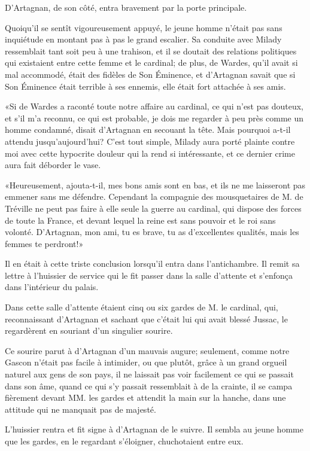 D'Artagnan, de son côté, entra bravement par la porte principale. 

Quoiqu'il se sentît vigoureusement appuyé, le jeune homme n'était pas sans inquiétude en montant pas à pas le grand escalier. Sa conduite avec Milady ressemblait tant soit peu à une trahison, et il se doutait des relations politiques qui existaient entre cette femme et le cardinal; de plus, de Wardes, qu'il avait si mal accommodé, était des fidèles de Son Éminence, et d'Artagnan savait que si Son Éminence était terrible à ses ennemis, elle était fort attachée à ses amis. 

«Si de Wardes a raconté toute notre affaire au cardinal, ce qui n'est pas douteux, et s'il m'a reconnu, ce qui est probable, je dois me regarder à peu près comme un homme condamné, disait d'Artagnan en secouant la tête. Mais pourquoi a-t-il attendu jusqu'aujourd'hui? C'est tout simple, Milady aura porté plainte contre moi avec cette hypocrite douleur qui la rend si intéressante, et ce dernier crime aura fait déborder le vase. 

«Heureusement, ajouta-t-il, mes bons amis sont en bas, et ils ne me laisseront pas emmener sans me défendre. Cependant la compagnie des mousquetaires de M. de Tréville ne peut pas faire à elle seule la guerre au cardinal, qui dispose des forces de toute la France, et devant lequel la reine est sans pouvoir et le roi sans volonté. D'Artagnan, mon ami, tu es brave, tu as d'excellentes qualités, mais les femmes te perdront!» 

Il en était à cette triste conclusion lorsqu'il entra dans l'antichambre. Il remit sa lettre à l'huissier de service qui le fit passer dans la salle d'attente et s'enfonça dans l'intérieur du palais. 

Dans cette salle d'attente étaient cinq ou six gardes de M. le cardinal, qui, reconnaissant d'Artagnan et sachant que c'était lui qui avait blessé Jussac, le regardèrent en souriant d'un singulier sourire. 

Ce sourire parut à d'Artagnan d'un mauvais augure; seulement, comme notre Gascon n'était pas facile à intimider, ou que plutôt, grâce à un grand orgueil naturel aux gens de son pays, il ne laissait pas voir facilement ce qui se passait dans son âme, quand ce qui s'y passait ressemblait à de la crainte, il se campa fièrement devant MM. les gardes et attendit la main sur la hanche, dans une attitude qui ne manquait pas de majesté. 

L'huissier rentra et fit signe à d'Artagnan de le suivre. Il sembla au jeune homme que les gardes, en le regardant s'éloigner, chuchotaient entre eux. 

